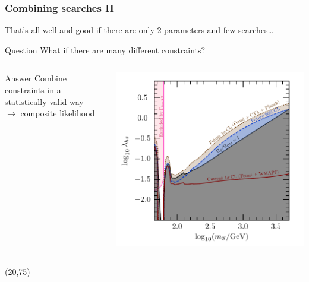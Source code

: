 \documentclass[xcolor=dvipsnames]{beamer}
\begin{document}
\begin{frame}
\frametitle{Combining searches {\rm II}}

That's all well and good if there are only 2 parameters and few searches\ldots\vspace{3mm}

  \begin{exampleblock}{Question}
  What if there are many different \alert{constraints}?
  \end{exampleblock} 

  {
    \begin{columns}[c]
      \begin{block}{Answer}
        Combine constraints in a statistically valid way \\$\rightarrow$ composite likelihood
      \end{block}\vspace{10mm}
      \includegraphics[width=\textwidth]{Fig3b}
    \end{columns}  
  }

  \begin{textblock}{80}(20,75)
  \end{textblock}

\end{frame}
\end{document}
